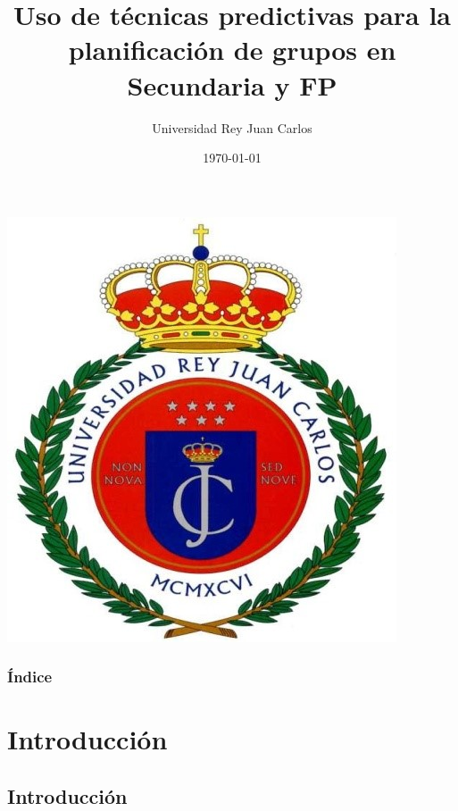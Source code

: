 \documentclass{beamer}
\title{Uso de técnicas predictivas para la planificación de grupos en Secundaria y FP}
\author{Universidad Rey Juan Carlos}
\institute{\textbf {Autor: Abel de Andrés Gómez\\ Tutor: Aurelio Berges García}} %
\date{{\small \today}}
\begin{document}

\begin{frame}[plain]{}
\begin{center}
\includegraphics [width =0.3 \textwidth ]{figures/escudo_urjc} %
\vspace*{-5mm}

\end{center}

\titlepage
\end{frame}

\begin{frame}
\frametitle{Índice} %
\begin{multicols}{2}
	\tableofcontents
\end{multicols}
\end{frame}






\section{Introducción} %
\subsection{Introducción} %
\end{document}
